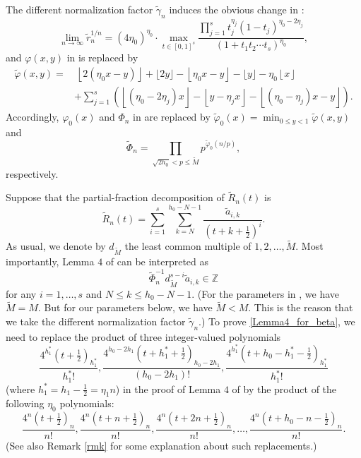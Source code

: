 \documentclass[11pt]{amsart}
\numberwithin{equation}{section}
\begin{document}
The different normalization factor $\widetilde{\gamma}_{n}$ induces the obvious change in \cite[\S 3, Lemma 2]{Zu19}:
\[  \lim _{n \rightarrow \infty} \widetilde{r}_{n}^{1 / n}=\left(4 \eta_{0}\right)^{\eta_{0}} \cdot \max _{t \in[0,1]^{s}} \frac{\prod_{j=1}^{s} t_{j}^{\eta_{j}}\left(1-t_{j}\right)^{\eta_{0}-2 \eta_{j}}}{\left(1+t_{1} t_{2} \cdots t_{s}\right)^{\eta_{0}}},\]
and $\varphi(x,y)$ in \cite[\S 3, Lemma 4]{Zu19} is replaced by
\begin{align*}
\widetilde{\varphi}(x, y) =&~\left\lfloor 2\left(\eta_{0} x-y\right)\right\rfloor+\lfloor 2 y\rfloor-\left\lfloor\eta_{0} x-y\right\rfloor-\lfloor y\rfloor-\eta_{0}\left\lfloor x\right\rfloor \\
&+\sum_{j=1}^{s}\left(\left\lfloor\left(\eta_{0}-2 \eta_{j}\right) x\right\rfloor-\left\lfloor y-\eta_{j} x\right\rfloor-\left\lfloor\left(\eta_{0}-\eta_{j}\right) x-y\right\rfloor\right).
\end{align*}
Accordingly, $\varphi_0(x)$ and $\Phi_n$ in \cite[\S 3, Lemma 4]{Zu19} are replaced by $\widetilde{\varphi}_0(x) = \min _{0 \leqslant y<1} \widetilde{\varphi}(x, y)$ and
\[ \widetilde{\Phi}_{n}=\prod_{\sqrt{2 h_{0}}<p \leqslant \widetilde{M}} p^{\widetilde{\varphi}_{0}(n / p)}, \]
respectively.

Suppose that the partial-fraction decomposition of $\widetilde{R}_{n}(t)$ is
\[ \widetilde{R}_{n}(t) = \sum_{i=1}^{s} \sum_{k=N}^{h_{0}-N-1} \frac{\widetilde{a}_{i, k}}{\left(t+k+\frac{1}{2}\right)^{i}}. \]
As usual, we denote by $d_{\widetilde{M}}$ the least common multiple of $1,2,\ldots,\widetilde{M}$. Most importantly, Lemma $4$ of \cite[\S 3]{Zu19} can be interpreted as
\begin{equation}\label{Lemma4_for_beta}
\widetilde{\Phi}_{n}^{-1} d_{\widetilde{M}}^{s-i} \widetilde{a}_{i,k} \in \mathbb{Z}
\end{equation}
for any $i=1, \ldots, s$ and $N \leqslant k \leqslant h_{0}-N-1$. (For the parameters in \cite[\S 3]{Zu19}, we have $\widetilde{M} = M$. But for our parameters below, we have $\widetilde{M} < M$. This is the reason that we take the different normalization factor $\widetilde{\gamma}_{n}$.) To prove \eqref{Lemma4_for_beta}, we need to replace the product of three integer-valued polynomials
\[ \frac{4^{h_{1}^{*}}\left(t+\frac{1}{2}\right)_{h_{1}^{*}}}{h_{1}^{*} !}, \frac{4^{h_{0}-2 h_{1}}\left(t+h_{1}^{*}+\frac{1}{2}\right)_{h_{0}-2 h_{1}}}{\left(h_{0}-2 h_{1}\right) !}, \frac{4^{h_{1}^{*}}\left(t+h_{0}-h_{1}^{*}-\frac{1}{2}\right)_{h_{1}^{*}}}{h_{1}^{*} !} \]
(where $h_{1}^{*}=h_{1}-\frac{1}{2}=\eta_{1} n$) in the proof of Lemma $4$ of \cite[\S 3]{Zu19} by the product of the following $\eta_{0}$ polynomials:
\[ \frac{4^{n}\left(t+\frac{1}{2}\right)_{n}}{n !}, \frac{4^{n}\left(t+n+\frac{1}{2}\right)_{n}}{n !}, \frac{4^{n}\left(t+2 n+\frac{1}{2}\right)_{n}}{n !}, \ldots, \frac{4^{n}\left(t+h_{0}-n-\frac{1}{2}\right)_{n}}{n !}. \]
(See also Remark \ref{rmk} for some explanation about such replacements.)
\end{document}
